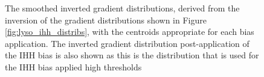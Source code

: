 \begin{figure}
	\centering
	\caption{The smoothed inverted gradient distributions, derived from the inversion of the gradient distributions shown in Figure \ref{fig:lyso_ihh_distribs}, with the centroids appropriate for each bias application. The inverted gradient distribution post-application of the IHH bias is also shown as this is the distribution that is used for the IHH bias applied high thresholds}
	\label{fig:lyso_aht_distribs}
\end{figure}


